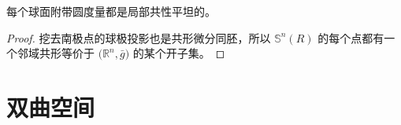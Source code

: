 \begin{corollary}
  每个球面附带圆度量都是局部共性平坦的。
\end{corollary}
\begin{proof}
  挖去南极点的球极投影也是共形微分同胚，所以 $\mathbb{S}^n(R)$ 的每个点都有一个邻域共形等价于 $\bigl(\mathbb{R}^n,\bar g\bigr)$ 的某个开子集。
\end{proof}

\section{双曲空间}




















